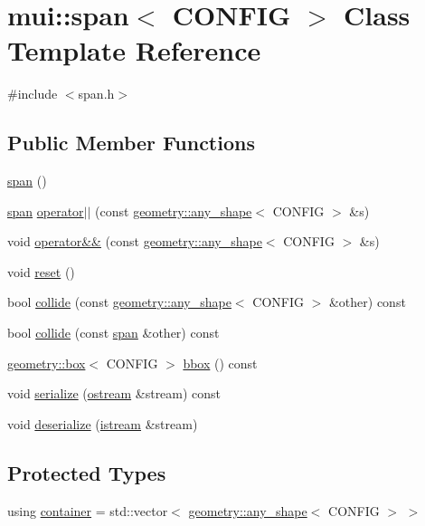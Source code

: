 \hypertarget{classmui_1_1span}{}\section{mui\+:\+:span$<$ C\+O\+N\+F\+IG $>$ Class Template Reference}
\label{classmui_1_1span}


{\ttfamily \#include $<$span.\+h$>$}

\subsection*{Public Member Functions}
\begin{DoxyCompactItemize}
\item 
\hyperlink{classmui_1_1span_a0d3a14ad0a07096e4b4f55be5df00029}{span} ()
\item 
\hyperlink{classmui_1_1span}{span} \hyperlink{classmui_1_1span_a66882baecb835ef0a513d90c7f316772}{operator$\vert$$\vert$} (const \hyperlink{classmui_1_1geometry_1_1any__shape}{geometry\+::any\+\_\+shape}$<$ C\+O\+N\+F\+IG $>$ \&s)
\item 
void \hyperlink{classmui_1_1span_abbc5c7ce523c437ae86ac7d7f84ab85d}{operator\&\&} (const \hyperlink{classmui_1_1geometry_1_1any__shape}{geometry\+::any\+\_\+shape}$<$ C\+O\+N\+F\+IG $>$ \&s)
\item 
void \hyperlink{classmui_1_1span_aefd319e26055d859c2c38134adace914}{reset} ()
\item 
bool \hyperlink{classmui_1_1span_a70eb8c64b35137c63b1862f94ddcc6a5}{collide} (const \hyperlink{classmui_1_1geometry_1_1any__shape}{geometry\+::any\+\_\+shape}$<$ C\+O\+N\+F\+IG $>$ \&other) const
\item 
bool \hyperlink{classmui_1_1span_aac34fb8df6ebc8ae9eed782f7e6141ea}{collide} (const \hyperlink{classmui_1_1span}{span} \&other) const
\item 
\hyperlink{classmui_1_1geometry_1_1box}{geometry\+::box}$<$ C\+O\+N\+F\+IG $>$ \hyperlink{classmui_1_1span_a15a9322c12cffb05745ba5f6036a9238}{bbox} () const
\item 
void \hyperlink{classmui_1_1span_ad9386445bbcad54a7aefcf1493d98cb1}{serialize} (\hyperlink{classmui_1_1ostream}{ostream} \&stream) const
\item 
void \hyperlink{classmui_1_1span_a18c5604de701f271a7a7a4c7c3bb38b1}{deserialize} (\hyperlink{classmui_1_1istream}{istream} \&stream)
\end{DoxyCompactItemize}
\subsection*{Protected Types}
\begin{DoxyCompactItemize}
\item 
using \hyperlink{classmui_1_1span_a255f188b78cfdd6c0be79119c4bcfe82}{container} = std\+::vector$<$ \hyperlink{classmui_1_1geometry_1_1any__shape}{geometry\+::any\+\_\+shape}$<$ C\+O\+N\+F\+IG $>$ $>$
\end{DoxyCompactItemize}
